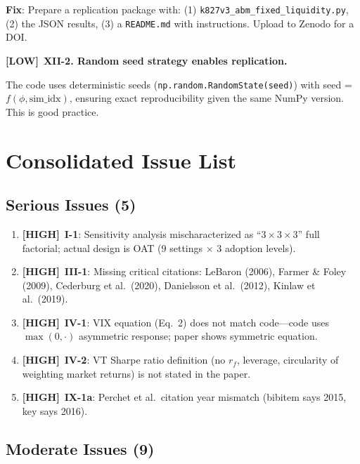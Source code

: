 \documentclass[12pt,a4paper]{article}
\newcommand{\HIGH}{\textbf{\textcolor{errorred}{[HIGH]}}}
\newcommand{\LOW}{\textbf{\textcolor{okgreen}{[LOW]}}}
\begin{document}
\textbf{Fix}: Prepare a replication package with: (1) \texttt{k827v3\_abm\_fixed\_liquidity.py}, (2) the JSON results, (3) a \texttt{README.md} with instructions. Upload to Zenodo for a DOI.

\medskip

\LOW\ \textbf{XII-2. Random seed strategy enables replication.}

The code uses deterministic seeds (\texttt{np.random.RandomState(seed)}) with seed = $f(\phi, \text{sim\_idx})$, ensuring exact reproducibility given the same NumPy version. This is good practice.


\section*{Consolidated Issue List}

\subsection*{\textcolor{errorred}{Serious Issues (5)}}

\begin{enumerate}
  \item \HIGH\ \textbf{I-1}: Sensitivity analysis mischaracterized as ``$3\times3\times3$'' full factorial; actual design is OAT (9 settings $\times$ 3 adoption levels).
  \item \HIGH\ \textbf{III-1}: Missing critical citations: LeBaron (2006), Farmer \& Foley (2009), Cederburg et al.\ (2020), Danielsson et al.\ (2012), Kinlaw et al.\ (2019).
  \item \HIGH\ \textbf{IV-1}: VIX equation (Eq.~2) does not match code---code uses $\max(0, \cdot)$ asymmetric response; paper shows symmetric equation.
  \item \HIGH\ \textbf{IV-2}: VT Sharpe ratio definition (no $r_f$, leverage, circularity of weighting market returns) is not stated in the paper.
  \item \HIGH\ \textbf{IX-1a}: Perchet et al.\ citation year mismatch (bibitem says 2015, key says 2016).
\end{enumerate}

\subsection*{\textcolor{warncolor}{Moderate Issues (9)}}
\end{document}
